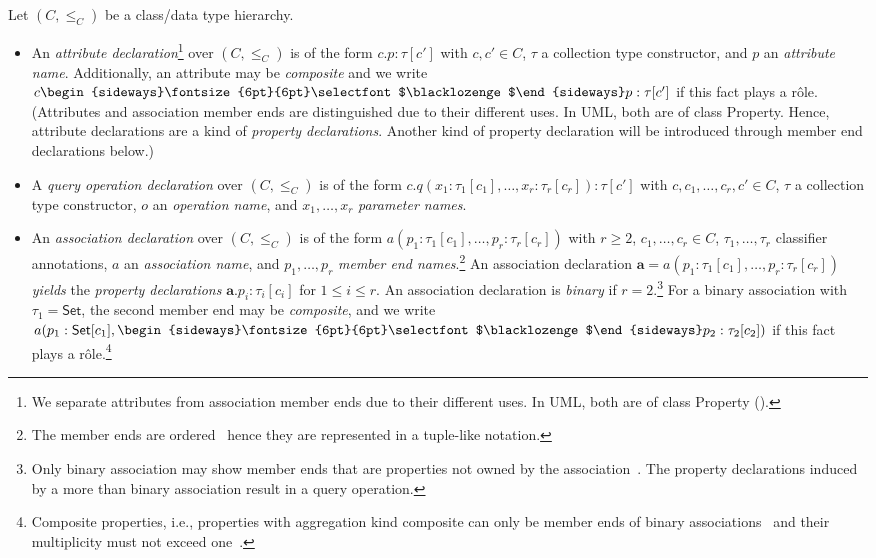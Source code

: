 \documentclass[10pt, a4paper]{isov2}
\newcommand{\uml}[1]{\textsf{#1}}
\newcommand{\composition}{\raisebox{0.2pt}{\begin{sideways}\fontsize{6pt}{6pt}\selectfont$\blacklozenge$\end{sideways}}}
\begin{document}
Let $(C, {\leq_C})$ be a class/data type hierarchy.
%
 \begin{itemize} [label={--}, leftmargin=*]
  \item An \emph{attribute declaration}\footnote{We separate attributes
 from association member ends due to their different uses.  In UML,
 both are of class \uml{Property} (\cite[p.~109]{uml-2.5}).} over $(C, {\leq_C})$ is of the form
$c.p : \tau[c']$ with $c, c' \in C$, $\tau$ a collection type
constructor, and $p$ an \emph{attribute name}. Additionally, an attribute may be \emph{composite} and we write
$c\composition p : \tau[c']$ if this fact plays a rôle. (Attributes
  and association member ends are distinguished due to their different uses.  In UML,
  both are of class \uml{Property}. Hence, attribute 
declarations are a kind of \emph{property declarations}. Another
kind of property declaration will be introduced through member end
declarations below.) 

  \item A \emph{query operation declaration} over $(C, {\leq_C})$ is of
the form $c.q(x_1 : \tau_1[c_1], \dots, x_r : \tau_r[c_r]) : \tau[c']$
with $c, c_1,\ldots, c_r, c' \in C$, $\tau$ a collection type
constructor, $o$ an \emph{operation name}, and $x_1, \ldots, x_r$
\emph{parameter names}.

  \item An \emph{association declaration} over $(C, {\leq_C})$
is of the form $a(p_1 : \tau_1[c_1], \dots, p_r : \tau_r[c_r])$
with $r \geq 2$,
$c_1, \dots, c_r \in C$,
$\tau_1, \ldots, \tau_r$
classifier annotations, $a$
an \emph{association name}, and $p_1, \dots, p_r$
\emph{member end names}.\footnote{The member ends are
  ordered~\cite[p.~197]{uml-2.5} hence they are represented in a
  tuple-like notation.}  An association declaration
$\mathbf{a} = a(p_1 : \tau_1[c_1], \ldots, p_r : \tau_r[c_r])$
\emph{yields} the \emph{property declarations}
$\mathbf{a}.p_i : \tau_i[c_i]$
for $1 \leq i \leq r$.
An association declaration is \emph{binary} if $r = 2$.\footnote{Only
  binary association may show member ends that are properties not owned
  by the association~\cite[p.~218]{uml-2.5}.  The property declarations
  induced by a more than binary association result in a query
  operation.}  For a binary association with $\tau_1 = \mathsf{Set}$,
the second member end may be \emph{composite}, and we write
$a(p_1 : \mathsf{Set}[c_1], \composition p_2 : \tau_2[c_2])$
if this fact plays a rôle.\footnote{Composite properties, i.e.,
  properties with aggregation kind \uml{composite} can only be member
  ends of binary associations~\cite[p.~218]{uml-2.5} and their
  multiplicity must not exceed one~\cite[p.~150]{uml-2.5}.}
 \end{itemize} 
\end{document}
